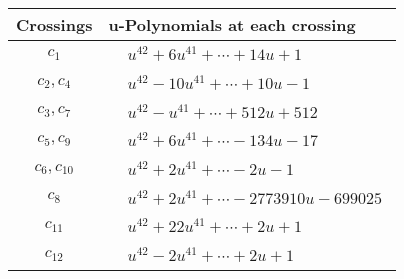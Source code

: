\documentclass[1p]{elsarticle_modified}
\theoremstyle{definition}
\begin{document}
\begin{tabular}{m{50pt}|m{274pt}}
Crossings & \hspace{64pt}u-Polynomials at each crossing \\
\hline $$\begin{aligned}c_{1}\end{aligned}$$&$\begin{aligned}
&u^{42}+6 u^{41}+\cdots+14 u+1
\end{aligned}$\\
\hline $$\begin{aligned}c_{2},c_{4}\end{aligned}$$&$\begin{aligned}
&u^{42}-10 u^{41}+\cdots+10 u-1
\end{aligned}$\\
\hline $$\begin{aligned}c_{3},c_{7}\end{aligned}$$&$\begin{aligned}
&u^{42}- u^{41}+\cdots+512 u+512
\end{aligned}$\\
\hline $$\begin{aligned}c_{5},c_{9}\end{aligned}$$&$\begin{aligned}
&u^{42}+6 u^{41}+\cdots-134 u-17
\end{aligned}$\\
\hline $$\begin{aligned}c_{6},c_{10}\end{aligned}$$&$\begin{aligned}
&u^{42}+2 u^{41}+\cdots-2 u-1
\end{aligned}$\\
\hline $$\begin{aligned}c_{8}\end{aligned}$$&$\begin{aligned}
&u^{42}+2 u^{41}+\cdots-2773910 u-699025
\end{aligned}$\\
\hline $$\begin{aligned}c_{11}\end{aligned}$$&$\begin{aligned}
&u^{42}+22 u^{41}+\cdots+2 u+1
\end{aligned}$\\
\hline $$\begin{aligned}c_{12}\end{aligned}$$&$\begin{aligned}
&u^{42}-2 u^{41}+\cdots+2 u+1
\end{aligned}$\\
\hline
\end{tabular}\\~\\
\end{document}
